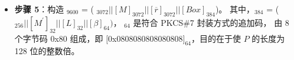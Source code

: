 \documentclass[main\_\_CN.tex]{subfiles}
\begin{document}
\begin{itemize}
    \item {\bfseries 步骤 5}：构造 \begin{math}[P]_{9600}\end{math} = (
            \begin{math}
                [Y]_{3072} ||
                [M]_{3072} ||
                [\overline{r}]_{3072} ||
                [Box]_{384}
            \end{math})。
            其中，\begin{math}[Box]_{384}\end{math} = (
            \begin{math}
                [MD]_{256} ||
                [M^{\prime}]_{32} ||
                [L]_{32} ||
                [\beta]_{64})
            \end{math}，
            \begin{math}[\beta]_{64} \end{math} 是符合 PKCS\#7 封装方式的追加码， 由 8 个字节码 0x80 组成，即 $[$0x0808080808080808$]_{64}$，目的在于使 \begin{math}P\end{math} 的长度为 128 位的整数倍。


\end{itemize}
\end{document}
